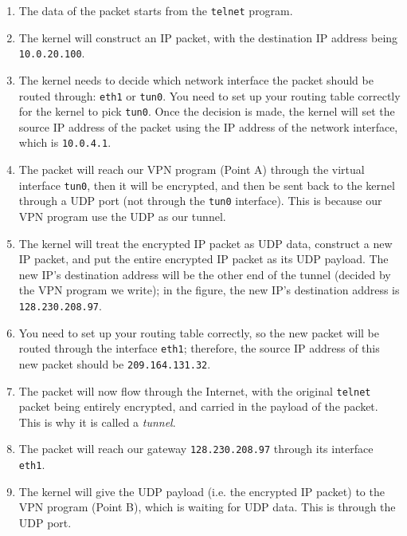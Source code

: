 \begin{enumerate}
\item The data of the packet starts from the {\tt telnet} program. 
\item The kernel will construct an IP packet, with the destination
      IP address being {\tt 10.0.20.100}. 
\item The kernel needs to decide which network interface the packet should 
      be routed through: {\tt eth1} or {\tt tun0}. You need to set up your routing
      table correctly for the kernel to pick {\tt tun0}. Once the decision is 
      made, the kernel will set the source IP address of the packet using
      the IP address of the network interface, which is {\tt 10.0.4.1}.

\item The packet will reach our VPN program (Point A) through the virtual 
      interface {\tt tun0}, then it will be encrypted, and then be sent back
      to the kernel through a UDP port (not through the {\tt tun0} interface).
      This is because our VPN program use the UDP as our tunnel.
      
\item The kernel will treat the encrypted IP packet as UDP data, construct
      a new IP packet, and put the entire encrypted IP packet as its UDP
      payload. The new IP's destination address will be the other end of the
      tunnel (decided by the VPN program we write); in the figure, the 
      new IP's destination address is {\tt 128.230.208.97}.


\item You need to set up your routing table correctly, so the new packet 
      will be routed through the interface {\tt eth1}; therefore, the 
      source IP address of this new packet should be {\tt 209.164.131.32}.


\item The packet will now flow through the Internet, with the original 
      {\tt telnet} packet being entirely encrypted, and carried in the 
      payload of the packet. This is why it is called a {\em tunnel}.

\item The packet will reach our gateway {\tt 128.230.208.97} through
      its interface {\tt eth1}.


\item The kernel will give the UDP payload (i.e. the encrypted IP packet)
      to the VPN program (Point B), which is waiting for UDP data. 
      This is through the UDP port.



\end{enumerate}
